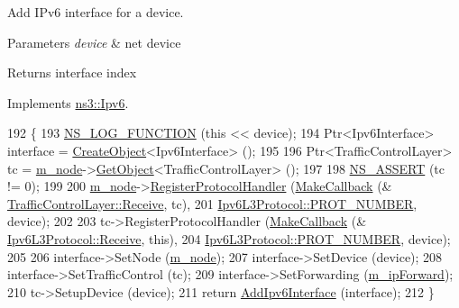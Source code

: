 Add I\+Pv6 interface for a device. 


\begin{DoxyParams}{Parameters}
{\em device} & net device \\
\hline
\end{DoxyParams}
\begin{DoxyReturn}{Returns}
interface index 
\end{DoxyReturn}


Implements \hyperlink{classns3_1_1Ipv6_a4fd7da82c16b8abf9ca15f982918e6a4}{ns3\+::\+Ipv6}.


\begin{DoxyCode}
192 \{
193   \hyperlink{log-macros-disabled_8h_a90b90d5bad1f39cb1b64923ea94c0761}{NS\_LOG\_FUNCTION} (\textcolor{keyword}{this} << device);
194   Ptr<Ipv6Interface> \textcolor{keyword}{interface }= \hyperlink{group__object_gad1d36559be10afa72c3656fd8598c1e2}{CreateObject}<Ipv6Interface> ();
195 
196   Ptr<TrafficControlLayer> tc = \hyperlink{classns3_1_1Ipv6L3Protocol_a543d8509395ee76de15d039ff1fce642}{m\_node}->\hyperlink{classns3_1_1Object_a13e18c00017096c8381eb651d5bd0783}{GetObject}<TrafficControlLayer> ();
197 
198   \hyperlink{assert_8h_a6dccdb0de9b252f60088ce281c49d052}{NS\_ASSERT} (tc != 0);
199 
200   \hyperlink{classns3_1_1Ipv6L3Protocol_a543d8509395ee76de15d039ff1fce642}{m\_node}->\hyperlink{classns3_1_1Node_af713f0e7ea5c49b4fa0b3613405c45fa}{RegisterProtocolHandler} (\hyperlink{group__makecallbackmemptr_ga9376283685aa99d204048d6a4b7610a4}{MakeCallback} (&
      \hyperlink{classns3_1_1TrafficControlLayer_ac8d6ccbab480b6b288aa155b8485e178}{TrafficControlLayer::Receive}, tc),
201                                    \hyperlink{classns3_1_1Ipv6L3Protocol_ac44af6866e3ddd3f0cb9fbe228afdfe9}{Ipv6L3Protocol::PROT\_NUMBER}, device);
202 
203   tc->RegisterProtocolHandler (\hyperlink{group__makecallbackmemptr_ga9376283685aa99d204048d6a4b7610a4}{MakeCallback} (&
      \hyperlink{classns3_1_1Ipv6L3Protocol_a8a95d576e8aee9a571db93bf686d850a}{Ipv6L3Protocol::Receive}, \textcolor{keyword}{this}),
204                                \hyperlink{classns3_1_1Ipv6L3Protocol_ac44af6866e3ddd3f0cb9fbe228afdfe9}{Ipv6L3Protocol::PROT\_NUMBER}, device);
205 
206   interface->SetNode (\hyperlink{classns3_1_1Ipv6L3Protocol_a543d8509395ee76de15d039ff1fce642}{m\_node});
207   interface->SetDevice (device);
208   interface->SetTrafficControl (tc);
209   interface->SetForwarding (\hyperlink{classns3_1_1Ipv6L3Protocol_a3dbdeac3cc4ec17f5a6ab9475fc8e7a8}{m\_ipForward});
210   tc->SetupDevice (device);
211   \textcolor{keywordflow}{return} \hyperlink{classns3_1_1Ipv6L3Protocol_aa0c786fd0209504c82b7278297a62f99}{AddIpv6Interface} (interface);
212 \}
\end{DoxyCode}


